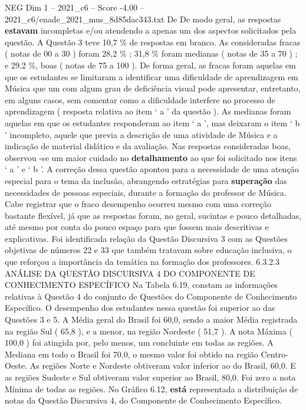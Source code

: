 \begin{textsample}{NEG Dim 1 – 2021\_c6 – Score -4.00 – 2021\_c6/enade\_2021\_mus\_8d85dac343.txt}
De De modo geral, as respostas \textbf{estavam} incompletas e/ou atendendo a apenas um dos aspectos solicitados pela questão.
A Questão 3 teve 10,7 \% de respostas em branco.
As consideradas fracas ( notas de 00 a 30 ) foram 28,2 \% ; 31,8 \% foram medianas ( notas de 35 a 70 ) ; e 29,2 \%, boas ( notas de 75 a 100 ).
De forma geral, as fracas foram aquelas em que os estudantes se limitaram a identificar uma dificuldade de aprendizagem em Música que um com algum grau de deficiência visual pode apresentar, entretanto, em alguns casos, sem comentar como a dificuldade interfere no processo de aprendizagem ( resposta relativa ao item ‘ a ’ da questão ).
As medianas foram aquelas em que os estudantes responderam ao item ‘ a ’, mas deixaram o item ‘ b ’ incompleto, aquele que previa a descrição de uma atividade de Música e a indicação de material didático e da avaliação.
Nas respostas consideradas boas, observou -se um maior cuidado no \textbf{detalhamento} ao que foi solicitado nos itens ‘ a ’ e ‘ b ’.
A correção dessa questão apontou para a necessidade de uma atenção especial para o tema da inclusão, abrangendo estratégias para \textbf{superação} das necessidades de pessoas especiais, durante a formação do professor de Música.
Cabe registrar que o fraco desempenho ocorreu mesmo com uma correção bastante flexível, já que as respostas foram, no geral, sucintas e pouco detalhadas, até mesmo por conta do pouco espaço para que fossem mais descritivas e explicativas.
Foi identificada relação da Questão Discursiva 3 com as Questões objetivas de números 22 e 33 que também tratavam sobre educação inclusiva, o que reforçou a importância da temática na formação dos professores. 6.3.2.3 ANÁLISE DA QUESTÃO DISCURSIVA 4 DO COMPONENTE DE CONHECIMENTO ESPECÍFICO Na Tabela 6.19, constam as informações relativas à Questão 4 do conjunto de Questões do Componente de Conhecimento Específico.
O desempenho dos estudantes nessa questão foi superior ao das Questões 3 e 5.
A Média geral do Brasil foi 60,0, sendo a maior Média registrada na região Sul ( 65,8 ), e a menor, na região Nordeste ( 51,7 ).
A nota Máxima ( 100,0 ) foi atingida por, pelo menos, um concluinte em todas as regiões.
A Mediana em todo o Brasil foi 70,0, o mesmo valor foi obtido na região Centro-Oeste.
As regiões Norte e Nordeste obtiveram valor inferior ao do Brasil, 60,0.
E as regiões Sudeste e Sul obtiveram valor superior ao Brasil, 80,0.
Foi zero a nota Mínima de todas as regiões.
No Gráfico 6.12, \textbf{está} representada a distribuição de notas da Questão Discursiva 4, do Componente de Conhecimento Específico.

\end{textsample}
